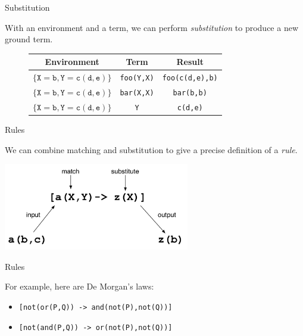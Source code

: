 \documentclass{beamer}
\begin{document}
\begin{frame}[fragile]{Substitution}

With an environment and a term, we can perform \emph{substitution} to produce
a new ground term.

\begin{figure}[h]
\begin{tabular}{|c|c|c|}
\hline
\textbf{Environment} & \textbf{Term} & \textbf{Result}\\
\hline
$\{\mathtt{X}=\mathtt{b},\mathtt{Y}=\mathtt{c(d,e)}\}$ & 
  \texttt{foo(Y,X)} & \texttt{foo(c(d,e),b)} \\
\hline
$\{\mathtt{X}=\mathtt{b},\mathtt{Y}=\mathtt{c(d,e)}\}$ & 
    \texttt{bar(X,X)} & \texttt{bar(b,b)} \\
\hline
$\{\mathtt{X}=\mathtt{b},\mathtt{Y}=\mathtt{c(d,e)}\}$ & 
    \texttt{Y} & \texttt{c(d,e)} \\
\hline
\end{tabular}
\end{figure}

\end{frame}


\begin{frame}[fragile]{Rules}

We can combine matching and substitution to give a precise definition of a
\emph{rule}.

\begin{center}
\includegraphics[height=1.5in]{images/rule}
\end{center}

\end{frame}


\begin{frame}[fragile]{Rules}

For example, here are De Morgan's laws:

\begin{itemize}
  \item \texttt{[not(or(P,Q)) -> and(not(P),not(Q))]}
  \item \texttt{[not(and(P,Q)) -> or(not(P),not(Q))]}
\end{itemize}

\end{frame}
\end{document}
